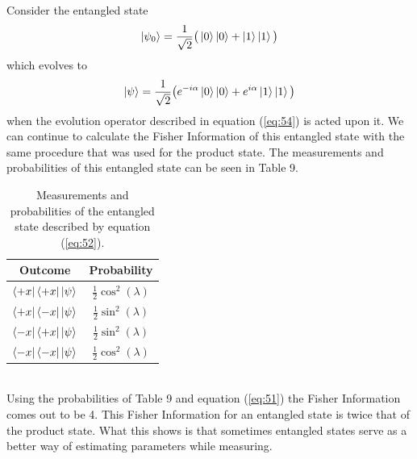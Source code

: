 \documentclass[twocolumn]{article}
\begin{document}
Consider the entangled state
\begin{equation} \label{eq:60}
\ket{\psi_0}=\frac{1}{\sqrt{2}}\big(\ket{0}\ket{0}+\ket{1}\ket{1}\big)
\end{equation}
which evolves to 
\begin{equation} \label{eq:61}
\ket{\psi}=\frac{1}{\sqrt{2}}\big(e^{-i\alpha}\ket{0}\ket{0}+e^{i\alpha}\ket{1}\ket{1}\big)
\end{equation}
when the evolution operator described in equation (\ref{eq:54}) is acted upon it. We can continue to calculate the Fisher Information of this entangled state with the same procedure that was used for the product state. The measurements and probabilities of this entangled state can be seen in Table 9.
\begin{table}[h!]
\begin{center}
\begin{tabular}{ |c|c| }
\hline Outcome & Probability \\
\hline $\bra{+x}\bra{+x}\ket{\psi}$ & $\frac{1}{2}\cos^2{(\lambda)}$ \\
\hline $\bra{+x}\bra{-x}\ket{\psi}$ & $\frac{1}{2}\sin^2{(\lambda)}$ \\
\hline $\bra{-x}\bra{+x}\ket{\psi}$ & $\frac{1}{2}\sin^2{(\lambda)}$ \\
\hline $\bra{-x}\bra{-x}\ket{\psi}$ & $\frac{1}{2}\cos^2{(\lambda)}$ \\
\hline
\end{tabular}
\caption{Measurements and probabilities of the entangled state described by equation (\ref{eq:52}).}
\end{center}
\end{table} \\
Using the probabilities of Table 9 and equation (\ref{eq:51}) the Fisher Information comes out to be 4. This Fisher Information for an entangled state is twice that of the product state. What this shows is that sometimes entangled states serve as a better way of estimating parameters while measuring.
\end{document}
